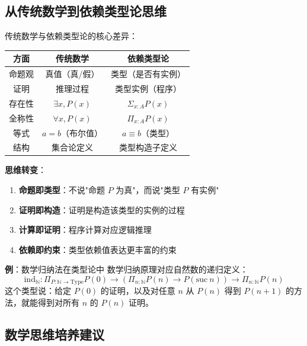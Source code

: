 \documentclass[12pt,a4paper,UTF8]{ctexart}
\begin{document}
\subsection{从传统数学到依赖类型论思维}

传统数学与依赖类型论的核心差异：

\begin{table}[ht]
\centering
\begin{tabular}{|c|c|c|}
\hline
方面 & 传统数学 & 依赖类型论 \\
\hline
命题观 & 真值（真/假） & 类型（是否有实例） \\
\hline
证明 & 推理过程 & 类型实例（程序） \\
\hline
存在性 & $\exists x, P(x)$ & $\Sigma_{x:A} P(x)$ \\
\hline
全称性 & $\forall x, P(x)$ & $\Pi_{x:A} P(x)$ \\
\hline
等式 & $a = b$（布尔值） & $a \equiv b$（类型） \\
\hline
结构 & 集合论定义 & 类型构造子定义 \\
\hline
\end{tabular}
\end{table}

\textbf{思维转变}：
\begin{enumerate}
    \item \textbf{命题即类型}：不说"命题 $P$ 为真"，而说"类型 $P$ 有实例"
    \item \textbf{证明即构造}：证明是构造该类型的实例的过程
    \item \textbf{计算即证明}：程序计算对应逻辑推理
    \item \textbf{依赖即约束}：类型依赖值表达更丰富的约束
\end{enumerate}

\textbf{例}：数学归纳法在类型论中
数学归纳原理对应自然数的递归定义：
$$\mathrm{ind}_\mathbb{N} : \Pi_{P:\mathbb{N}\to\mathrm{Type}} P(0) \to (\Pi_{n:\mathbb{N}} P(n) \to P(\mathrm{suc}\ n)) \to \Pi_{n:\mathbb{N}} P(n)$$
这个类型说：给定 $P(0)$ 的证明，以及对任意 $n$ 从 $P(n)$ 得到 $P(n+1)$ 的方法，就能得到对所有 $n$ 的 $P(n)$ 证明。

\subsection{数学思维培养建议}
\end{document}
